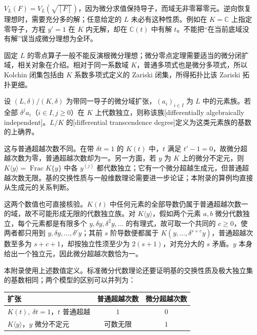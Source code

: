 \ProseParagraphBreak
\(V_L(F)=V_L(\sqrt{[F]})\)，因为微分求值保持导子，而域无非零幂零元。逆向恢复理想时，需要充分多的解；任意给定的 \(L\) 未必有这种性质。例如在 \(K=\mathbb C\) 上指定零导子，方程 \(y'=1\) 在 \(K\) 内无解，却在 \(\mathbb C(t)\) 中有解 \(t\)。不能把“在当前底域没有解”误当成微分理想为全环。

固定 \(L\) 的零点算子一般不能反演根微分理想；微分零点定理需要适当的微分闭扩域，相关对象在介绍。相对于同一系数域 \(K\)，普通多项式也是微分多项式，所以 Kolchin 闭集包括由 \(K\) 系数多项式定义的 Zariski 闭集，所得拓扑比该 Zariski 拓扑更细。

\begin{definition}\label{b3:def:differential-transcendence}
	设 \((L,\delta)/(K,\delta)\) 为带同一导子的微分域扩张，\((a_i)_{i\in I}\) 为 \(L\) 中的元素族。若全部 \(\delta^ja_i\)（\(i\in I,j\ge0\)）在 \(K\) 上代数独立，则称该族[differentially algebraically independent]。\(L/K\) 的[differential transcendence degree]定义为这类元素族的基数的上确界。
\end{definition}

这与普通超越次数不同。在带 \(\delta t=1\) 的 \(K(t)\) 中，\(t\) 满足 \(t'-1=0\)，故微分超越次数为零，普通超越次数却为一。另一方面，若 \(y\) 为 \(K\) 上的微分不定元，则 \(K\langle y\rangle=\operatorname{Frac}K\{y\}\) 中各 \(y^{(j)}\) 都代数独立；它有一个微分超越生成元，但普通超越次数无限。基的交换性质与一般维数理论需要进一步论证；本附录的算例均直接从生成元的关系判断。

这两个数值也可直接核验。\(K(t)\) 中任何元素的全部导数仍属于普通超越次数一的域，故不可能形成无限的代数独立族。对 \(K\langle y\rangle\)，假如两个元素 \(a,b\) 微分代数独立，每个元素都是有限多个 \(y,\delta y,\delta^2y,\ldots\) 的有理式，故可取一个共同的 \(c\ge0\)，使两者都只用到 \(y,\delta y,\ldots,\delta^cy\)；其前 \(s\) 阶导数便都属于 \(K(y,\ldots,\delta^{s+c}y)\)，普通超越次数至多为 \(s+c+1\)，却按独立性须至少为 \(2(s+1)\)，对充分大的 \(s\) 矛盾。\(y\) 本身给出一个独立元，因此微分超越次数恰为一。

本附录使用上述数值定义。标准微分代数理论还要证明基的交换性质及极大独立集的基数相同；两个模型的区别可以并列为：
\begin{center}
	\begin{tabular}{@{}lcc@{}}
		\toprule
		扩张 & 普通超越次数 & 微分超越次数 \\
		\midrule
		\(K(t),\ \delta t=1\)，\(t\) 普通超越 & \(1\) & \(0\) \\
		\(K\langle y\rangle\)，\(y\) 微分不定元 & 可数无限 & \(1\) \\
		\bottomrule
	\end{tabular}
\end{center}


